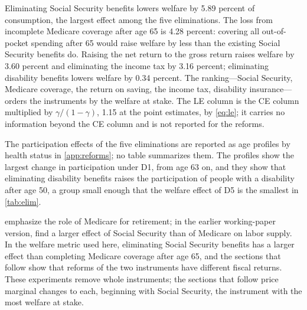Eliminating Social Security benefits lowers welfare by 5.89 percent of consumption, the largest effect among the five eliminations. %
The loss from incomplete Medicare coverage after age 65 is 4.28 percent: covering all out-of-pocket spending after 65 would raise welfare by less than the existing Social Security benefits do. %
Raising the net return to the gross return raises welfare by 3.60 percent and eliminating the income tax by 3.16 percent; eliminating disability benefits lowers welfare by 0.34 percent. %
The ranking---Social Security, Medicare coverage, the return on saving, the income tax, disability insurance---orders the instruments by the welfare at stake. The LE column is the CE column multiplied by $\gamma/(1-\gamma)$, 1.15 at the point estimates, by \eqref{eq:le}; it carries no information beyond the CE column and is not reported for the reforms. %

The participation effects of the five eliminations are reported as age profiles by health status in \autoref{app:reforms}; no table summarizes them. The profiles show the largest change in participation under D1, from age 63 on, and they show that eliminating disability benefits raises the participation of people with a disability after age 50, a group small enough that the welfare effect of D5 is the smallest in \autoref{tab:elim}.

\citet{french2011effects} emphasize the role of Medicare for retirement; in the earlier working-paper version, \citet{French2004} find a larger effect of Social Security than of Medicare on labor supply. %
In the welfare metric used here, eliminating Social Security benefits has a larger effect than completing Medicare coverage after age 65, and the sections that follow show that reforms of the two instruments have different fiscal returns. %
These experiments remove whole instruments; the sections that follow price marginal changes to each, beginning with Social Security, the instrument with the most welfare at stake. %

